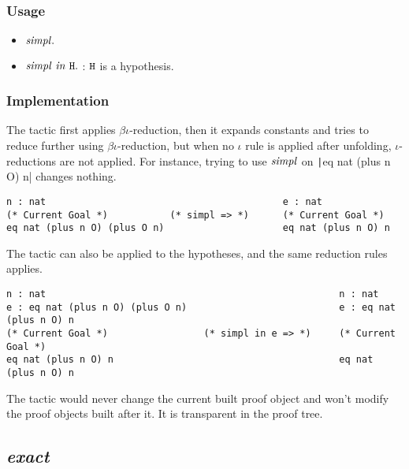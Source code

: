 \subsubsection*{Usage}
\begin{itemize}
\item ${\it simpl}.$
\item ${\it simpl\ in}\ \tt H.$ : $\tt H$ is a hypothesis.
\end{itemize}

\subsubsection*{Implementation}

The tactic first applies $\beta\iota$-reduction, then it expands constants and tries to reduce 
further using $\beta\iota$-reduction, but when no $\iota$ rule is applied after unfolding,
$\iota$-reductions are not applied. For instance, trying to use $\it simpl$ on 
\texttt|eq nat (plus n O) n| changes nothing.
\begin{center}
\begin{minipage}{0.8\textwidth}
\begin{verbatim}
n : nat                                          e : nat
(* Current Goal *)           (* simpl => *)      (* Current Goal *)
eq nat (plus n O) (plus O n)                     eq nat (plus n O) n
\end{verbatim}
\end{minipage}
\end{center}

The tactic can also be applied to the hypotheses, and the same reduction rules applies.
\begin{center}
\begin{verbatim}
n : nat                                                    n : nat                
e : eq nat (plus n O) (plus O n)                           e : eq nat (plus n O) n
(* Current Goal *)                 (* simpl in e => *)     (* Current Goal *)      
eq nat (plus n O) n                                        eq nat (plus n O) n         
\end{verbatim} 
\end{center}

The tactic would never change the current built proof object and won't modify the proof objects built after it.
It is transparent in the proof tree.

\subsection{\it exact}


